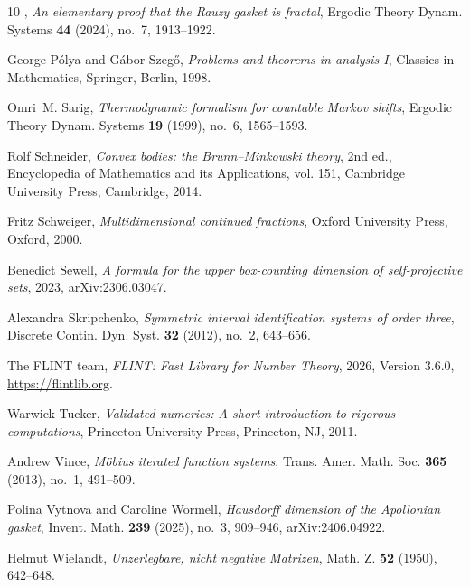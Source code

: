 \documentclass[11pt]{amsart}
\theoremstyle{definition}
\theoremstyle{remark}
\begin{document}
\begin{thebibliography}{10}
\bysame, \emph{An elementary proof that the {R}auzy gasket is fractal}, Ergodic
  Theory Dynam. Systems \textbf{44} (2024), no.~7, 1913--1922.

George P{\'o}lya and G{\'a}bor Szeg{\H o}, \emph{Problems and theorems in
  analysis {I}}, Classics in Mathematics, Springer, Berlin, 1998.

Omri~M. Sarig, \emph{Thermodynamic formalism for countable {M}arkov shifts},
  Ergodic Theory Dynam. Systems \textbf{19} (1999), no.~6, 1565--1593.

Rolf Schneider, \emph{Convex bodies: the {B}runn--{M}inkowski theory}, 2nd ed.,
  Encyclopedia of Mathematics and its Applications, vol. 151, Cambridge
  University Press, Cambridge, 2014.

Fritz Schweiger, \emph{Multidimensional continued fractions}, Oxford University
  Press, Oxford, 2000.

Benedict Sewell, \emph{A formula for the upper box-counting dimension of
  self-projective sets}, 2023, arXiv:2306.03047.

Alexandra Skripchenko, \emph{Symmetric interval identification systems of order
  three}, Discrete Contin. Dyn. Syst. \textbf{32} (2012), no.~2, 643--656.

{The FLINT team}, \emph{{FLINT}: {F}ast {L}ibrary for {N}umber {T}heory}, 2026,
  Version 3.6.0, \url{https://flintlib.org}.

Warwick Tucker, \emph{Validated numerics: A short introduction to rigorous
  computations}, Princeton University Press, Princeton, NJ, 2011.

Andrew Vince, \emph{M\"obius iterated function systems}, Trans. Amer. Math.
  Soc. \textbf{365} (2013), no.~1, 491--509.

Polina Vytnova and Caroline Wormell, \emph{Hausdorff dimension of the
  {A}pollonian gasket}, Invent. Math. \textbf{239} (2025), no.~3, 909--946,
  arXiv:2406.04922.

Helmut Wielandt, \emph{Unzerlegbare, nicht negative {M}atrizen}, Math. Z.
  \textbf{52} (1950), 642--648.

\end{thebibliography}
\end{document}
